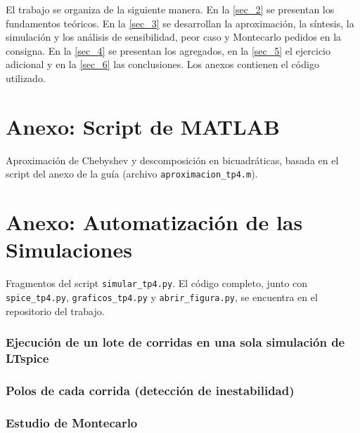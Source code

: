 \documentclass[12pt]{article}
\begin{document}
El trabajo se organiza de la siguiente manera. En la \autoref{sec_2} se presentan los fundamentos teóricos. En la \autoref{sec_3} se desarrollan la aproximación, la síntesis, la simulación y los análisis de sensibilidad, peor caso y Montecarlo pedidos en la consigna. En la \autoref{sec_4} se presentan los agregados, en la \autoref{sec_5} el ejercicio adicional y en la \autoref{sec_6} las conclusiones. Los anexos contienen el código utilizado.


\newpage


\newpage


\newpage


\newpage



\newpage
\printbibliography[heading=bibintoc, title={Bibliografía y Referencias}]

\newpage
\appendix
\renewcommand{\thesection}{\Alph{section}}
\section{Anexo: Script de MATLAB}
\label{anexo_matlab}
Aproximación de Chebyshev y descomposición en bicuadráticas, basada en el script del anexo de la guía (archivo \texttt{aproximacion\_tp4.m}).


\section{Anexo: Automatización de las Simulaciones}
\label{anexo_python}
Fragmentos del script \texttt{simular\_tp4.py}. El código completo, junto con \texttt{spice\_tp4.py}, \texttt{graficos\_tp4.py} y \texttt{abrir\_figura.py}, se encuentra en el repositorio del trabajo.

\subsubsection*{Ejecución de un lote de corridas en una sola simulación de LTspice}


\subsubsection*{Polos de cada corrida (detección de inestabilidad)}


\subsubsection*{Estudio de Montecarlo}

\end{document}
